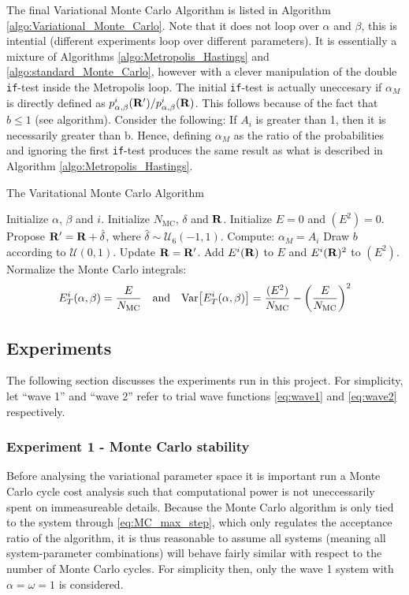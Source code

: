\documentclass[nofootinbib,reprint,english]{revtex4-1}
\begin{document}
The final Variational Monte Carlo Algorithm is listed in Algorithm \ref{algo:Variational_Monte_Carlo}. Note that it does not loop over \(\alpha\) and \(\beta\), this is intential (different experiments loop over different parameters). It is essentially a mixture of Algorithms \ref{algo:Metropolis_Hastings} and \ref{algo:standard_Monte_Carlo}, however with a clever manipulation of the double \texttt{if}-test inside the Metropolis loop. The initial \texttt{if}-test is actually uneccesary if \(\alpha_M\) is directly defined as \(p_{\alpha,\beta}^i(\vb{R}')/p_{\alpha,\beta}^i(\vb{R})\). This follows because of the fact that \(b\leq1\) (see algorithm). Consider the following: If \(A_i\) is greater than 1, then it is necessarily greater than b. Hence, defining \(\alpha_M\) as the ratio of the probabilities and ignoring the first \texttt{if}-test produces the same result as what is described in Algorithm \ref{algo:Metropolis_Hastings}.

\begin{algorithm}[H]
\caption{The Varitational Monte Carlo Algorithm}\label{algo:Variational_Monte_Carlo}
\begin{algorithmic}[1]
\State Initialize \(\alpha\), \(\beta\) and \(i\). 
\State Initialize \(N_\text{MC}\), \(\delta\) and \(\vb{R}\).
\State Initialize \(E=0\) and \((E^2)=0\).
	\State Propose \(\vb{R}'=\vb{R}+\hat{\delta}\), where \(\hat{\delta}\sim\mathcal{U}_6(-1,1)\).
	\State Compute: \(\alpha_M=A_i\)
	\State Draw \(b\) according to \(\mathcal{U}(0,1)\).
		\State Update \(\vb{R}=\vb{R}'\).
	\EndIf
	\State Add \(E^i(\vb{R})\) to \(E\) and \(E^i(\vb{R})^2\) to \((E^2)\).
\EndFor
\State Normalize the Monte Carlo integrals:
\[E_T^i(\alpha,\beta)=\frac{E}{N_\text{MC}}\qand \text{Var}\big[E_T^i(\alpha,\beta)\big]=\frac{(E^2)}{N_\text{MC}}-\bigg(\frac{E}{N_\text{MC}}\bigg)^2\]
\end{algorithmic}
\end{algorithm}

\subsection{Experiments}
The following section discusses the experiments run in this project. For simplicity, let ``wave 1'' and ``wave 2'' refer to trial wave functions \eqref{eq:wave1} and \eqref{eq:wave2} respectively.
\subsubsection{Experiment 1 - Monte Carlo stability}
Before analysing the variational parameter space it is important run a Monte Carlo cycle cost analysis such that computational power is not uneccessarily spent on immeasureable details. Because the Monte Carlo algorithm is only tied to the system through \eqref{eq:MC_max_step}, which only regulates the acceptance ratio of the algorithm, it is thus reasonable to assume all systems (meaning all system-parameter combinations) will behave fairly similar with respect to the number of Monte Carlo cycles. For simplicity then, only the wave 1 system with \(\alpha=\omega=1\) is considered.
\end{document}
